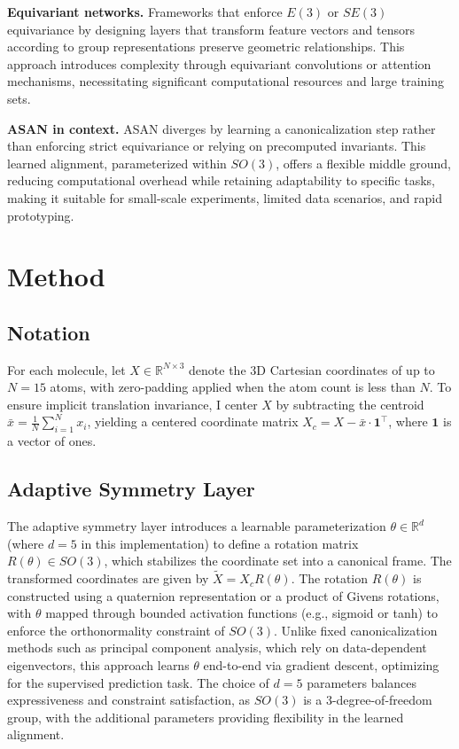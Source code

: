 \documentclass[12pt]{article}
\begin{document}
\textbf{Equivariant networks.} Frameworks that enforce $E(3)$ or $SE(3)$ equivariance by designing layers that transform feature vectors and tensors according to group representations preserve geometric relationships. This approach introduces complexity through equivariant convolutions or attention mechanisms, necessitating significant computational resources and large training sets.

\textbf{ASAN in context.} ASAN diverges by learning a canonicalization step rather than enforcing strict equivariance or relying on precomputed invariants. This learned alignment, parameterized within $SO(3)$, offers a flexible middle ground, reducing computational overhead while retaining adaptability to specific tasks, making it suitable for small-scale experiments, limited data scenarios, and rapid prototyping.

\section{Method}
\subsection{Notation}
For each molecule, let $X \in \mathbb{R}^{N \times 3}$ denote the 3D Cartesian coordinates of up to $N=15$ atoms, with zero-padding applied when the atom count is less than $N$. To ensure implicit translation invariance, I center $X$ by subtracting the centroid $\bar{x} = \frac{1}{N} \sum_{i=1}^N x_i$, yielding a centered coordinate matrix $X_c = X - \bar{x} \cdot \mathbf{1}^\top$, where $\mathbf{1}$ is a vector of ones.

\subsection{Adaptive Symmetry Layer}
The adaptive symmetry layer introduces a learnable parameterization $\theta \in \mathbb{R}^d$ (where $d=5$ in this implementation) to define a rotation matrix $R(\theta) \in SO(3)$, which stabilizes the coordinate set into a canonical frame. The transformed coordinates are given by $\tilde{X} = X_c R(\theta)$. The rotation $R(\theta)$ is constructed using a quaternion representation or a product of Givens rotations, with $\theta$ mapped through bounded activation functions (e.g., sigmoid or tanh) to enforce the orthonormality constraint of $SO(3)$. Unlike fixed canonicalization methods such as principal component analysis, which rely on data-dependent eigenvectors, this approach learns $\theta$ end-to-end via gradient descent, optimizing for the supervised prediction task. The choice of $d=5$ parameters balances expressiveness and constraint satisfaction, as $SO(3)$ is a 3-degree-of-freedom group, with the additional parameters providing flexibility in the learned alignment.
\end{document}

